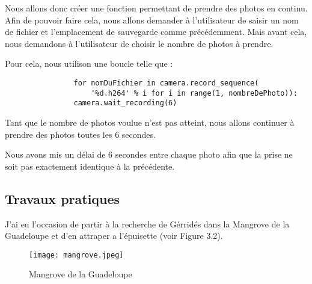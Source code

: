 \begin{flushleft}
            \vspace{0.2cm}

            Nous allons donc créer une fonction permettant de prendre des photos en continu.
            Afin de pouvoir faire cela, nous allons demander à l'utilisateur de saisir un nom de fichier et l'emplacement de sauvegarde comme précédemment.
            Mais avant cela, nous demandons à l'utilisateur de choisir le nombre de photos à prendre.

            \vspace{0.2cm}

            Pour cela, nous utilison une boucle telle que : 
            \begin{verbatim}
                for nomDuFichier in camera.record_sequence(
                    '%d.h264' % i for i in range(1, nombreDePhoto)):
                camera.wait_recording(6)
            \end{verbatim}

            Tant que le nombre de photos voulue n'est pas atteint, nous allons continuer à prendre des photos toutes les 6 secondes.

            \vspace{0.2cm}

            Nous avons mis un délai de 6 secondes entre chaque photo afin que la prise ne soit pas exactement identique à la précédente.
        \end{flushleft}

        

        \subsection{Travaux pratiques}
        J'ai eu l'occasion de partir à la recherche de Gérridés dans la Mangrove de la Guadeloupe et d'en attraper a l'épuisette (voir Figure 3.2).

        \begin{figure}[ht]
            \centering
            \texttt{[image: mangrove.jpeg]}
            \caption{Mangrove de la Guadeloupe}
        \end{figure}
        
        